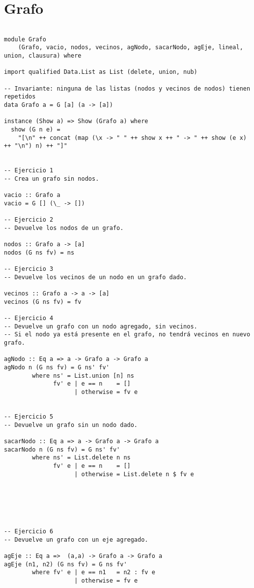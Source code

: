 \section{Grafo}

\begin{verbatim}

module Grafo 
    (Grafo, vacio, nodos, vecinos, agNodo, sacarNodo, agEje, lineal, union, clausura) where

import qualified Data.List as List (delete, union, nub)

-- Invariante: ninguna de las listas (nodos y vecinos de nodos) tienen repetidos
data Grafo a = G [a] (a -> [a])

instance (Show a) => Show (Grafo a) where
  show (G n e) = 
    "[\n" ++ concat (map (\x -> " " ++ show x ++ " -> " ++ show (e x) ++ "\n") n) ++ "]"


-- Ejercicio 1
-- Crea un grafo sin nodos.

vacio :: Grafo a
vacio = G [] (\_ -> [])

-- Ejercicio 2
-- Devuelve los nodos de un grafo.

nodos :: Grafo a -> [a]
nodos (G ns fv) = ns

-- Ejercicio 3
-- Devuelve los vecinos de un nodo en un grafo dado.

vecinos :: Grafo a -> a -> [a]
vecinos (G ns fv) = fv

-- Ejercicio 4
-- Devuelve un grafo con un nodo agregado, sin vecinos.
-- Si el nodo ya está presente en el grafo, no tendrá vecinos en nuevo grafo.

agNodo :: Eq a => a -> Grafo a -> Grafo a
agNodo n (G ns fv) = G ns' fv'
        where ns' = List.union [n] ns
              fv' e | e == n    = []
                    | otherwise = fv e


-- Ejercicio 5
-- Devuelve un grafo sin un nodo dado.

sacarNodo :: Eq a => a -> Grafo a -> Grafo a
sacarNodo n (G ns fv) = G ns' fv'
        where ns' = List.delete n ns
              fv' e | e == n    = []
                    | otherwise = List.delete n $ fv e






-- Ejercicio 6
-- Devuelve un grafo con un eje agregado.

agEje :: Eq a =>  (a,a) -> Grafo a -> Grafo a
agEje (n1, n2) (G ns fv) = G ns fv' 
        where fv' e | e == n1   = n2 : fv e
                    | otherwise = fv e



\end{verbatim}
